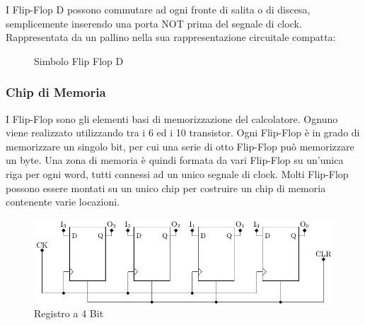 \documentclass{article}
\numberwithin{equation}{subsection}
\begin{document}
I Flip-Flop D possono commutare ad ogni fronte di salita o di discesa, semplicemente inserendo una porta NOT prima del segnale di clock. Rappresentata da un pallino nella sua rappresentazione circuitale compatta: 

\begin{figure}[H]%
    \centering%
    \qquad%
    \caption{Simbolo Flip Flop D}%
\end{figure}

\subsubsection{Chip di Memoria}

I Flip-Flop sono gli elementi basi di memorizzazione del calcolatore. Ognuno viene realizzato utilizzando tra i 6 ed i 10 transistor. Ogni Flip-Flop è in grado di memorizzare un singolo bit, per cui una 
serie di otto Flip-Flop può memorizzare un byte. Una zona di memoria è quindi formata da vari Flip-Flop su un'unica riga per ogni word, tutti connessi ad un unico segnale di clock. Molti Flip-Flop possono 
essere montati su un unico chip per costruire un chip di memoria contenente varie locazioni. 

\begin{figure}[H]%
    \centering%
    \includegraphics{chip-4-bit.pdf}%
    \caption{Registro a 4 Bit}%
\end{figure}
\end{document}
